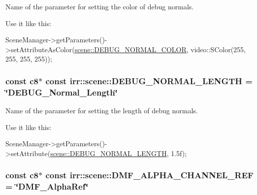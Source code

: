 Name of the parameter for setting the color of debug normals. 

Use it like this\+: 
\begin{DoxyCode}
SceneManager->getParameters()->setAttributeAsColor(\hyperlink{namespaceirr_1_1scene_a767a12984dbf7a4f0917993d748d1350}{scene::DEBUG\_NORMAL\_COLOR}, 
      video::SColor(255, 255, 255, 255));
\end{DoxyCode}
\subsubsection[{\texorpdfstring{D\+E\+B\+U\+G\+\_\+\+N\+O\+R\+M\+A\+L\+\_\+\+L\+E\+N\+G\+TH}{DEBUG\_NORMAL\_LENGTH}}]{\setlength{\rightskip}{0pt plus 5cm}const {\bf c8}$\ast$ const irr\+::scene\+::\+D\+E\+B\+U\+G\+\_\+\+N\+O\+R\+M\+A\+L\+\_\+\+L\+E\+N\+G\+TH = \char`\"{}D\+E\+B\+U\+G\+\_\+\+Normal\+\_\+\+Length\char`\"{}}\hypertarget{namespaceirr_1_1scene_a19153395855d08302b70dcfa9247eb51}{}\label{namespaceirr_1_1scene_a19153395855d08302b70dcfa9247eb51}


Name of the parameter for setting the length of debug normals. 

Use it like this\+: 
\begin{DoxyCode}
SceneManager->getParameters()->setAttribute(\hyperlink{namespaceirr_1_1scene_a19153395855d08302b70dcfa9247eb51}{scene::DEBUG\_NORMAL\_LENGTH}, 1.5f);
\end{DoxyCode}
\subsubsection[{\texorpdfstring{D\+M\+F\+\_\+\+A\+L\+P\+H\+A\+\_\+\+C\+H\+A\+N\+N\+E\+L\+\_\+\+R\+EF}{DMF\_ALPHA\_CHANNEL\_REF}}]{\setlength{\rightskip}{0pt plus 5cm}const {\bf c8}$\ast$ const irr\+::scene\+::\+D\+M\+F\+\_\+\+A\+L\+P\+H\+A\+\_\+\+C\+H\+A\+N\+N\+E\+L\+\_\+\+R\+EF = \char`\"{}D\+M\+F\+\_\+\+Alpha\+Ref\char`\"{}}\hypertarget{namespaceirr_1_1scene_afd6e025453e80983de80371dc56718ef}{}\label{namespaceirr_1_1scene_afd6e025453e80983de80371dc56718ef}


